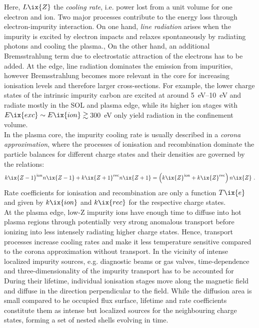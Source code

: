             Here, $L\ix{Z}$ the \textit{cooling rate}, i.e. power lost from a unit volume for one electron and ion. Two major processes contribute to the  energy loss through electron-impurity interaction. On one hand, \textit{line radiation} arises when the impurity is excited by electron impacts and relaxes spontaneously by radiating photons and cooling the plasma., On the other hand, an additional Bremsstrahlung term due to electrostatic attraction of the electrons has to be added. At the edge, line radiation dominates the emission from impurities, however Bremsstrahlung becomes more relevant in the core for increasing ionisation levels and therefore larger cross-sections. For example, the lower charge states of the intrinsic impurity carbon are excited at around \SIrange{5}{10}{\electronvolt} and radiate mostly in the SOL and plasma edge, while its higher ion stages with $E\ix{exc}\sim E\ix{ion}\gtrsim\,$\SI{300}{\electronvolt} only yield radiation in the confinement volume\cite{Ohtsuka1982}.\\%
            In the plasma core, the impurity cooling rate is usually described in a \textit{corona approximation}, where the processes of ionisation and recombination dominate the particle balances for different charge states and their densities are governed by the relations:
%
            \begin{align}%
                k\ix{Z-1}^{\text{ion}}n\ix{Z-1}+k\ix{Z+1}^{\text{rec}}n\ix{Z+1}=\left(k\ix{Z}^{\text{ion}}+k\ix{Z}^{\text{rec}}\right)n\ix{Z}\,\,.\nonumber%
            \end{align}%
%
            Rate coefficients for ionisation and recombination are only a function $T\ix{e}$ and given by $k\ix{ion}$ and $k\ix{rec}$ for the respective charge states.\\%
            At the plasma edge, low-Z impurity ions have enough time to diffuse into hot plasma regions through potentially very strong anomalous transport before ionizing into less intensely radiating higher charge states. Hence, transport processes increase cooling rates and make it less temperature sensitive compared to the corona approximation without transport. In the vicinity of intense localized impurity sources, e.g. diagnostic beams or gas valves, time-dependence and three-dimensionality of the impurity transport has to be accounted for During their lifetime, individual ionisation stages move along the magnetic field and diffuse in the direction perpendicular to the field. While the diffusion area is small compared to he occupied flux surface, lifetime and rate coefficients constitute them as intense but localized sources for the neighbouring charge states, forming a set of nested shells evolving in time.\\%

